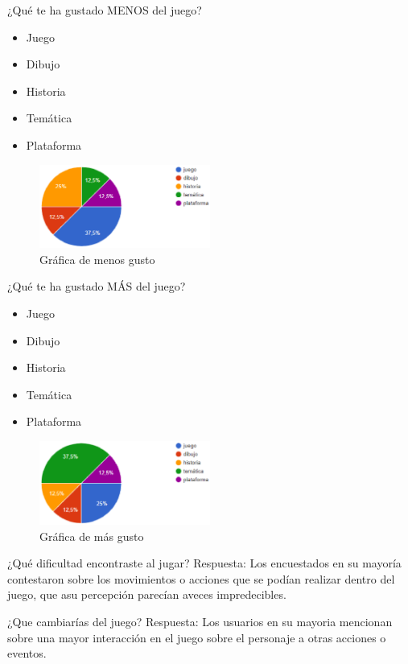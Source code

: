  ¿Qué te ha gustado MENOS del juego?
	\begin{itemize}
		\item Juego
		\item Dibujo
		\item Historia
		\item Temática
		\item Plataforma
	\end{itemize}

\begin{figure}
	\centering
	\caption{Gráfica de menos gusto}
	\label{fig:pos02}
	\includegraphics[width=0.5\textwidth]{04ResultadosObetnidos/pruebaR/imagenes/que/pos02}
\end{figure}

	
	¿Qué te ha gustado MÁS del juego?
\begin{itemize}
	\item Juego
	\item Dibujo
	\item Historia
	\item Temática
	\item Plataforma
\end{itemize}

\begin{figure}
	\centering
	\caption{Gráfica de más gusto}
	\label{fig:pos03}
	\includegraphics[width=0.5\textwidth]{04ResultadosObetnidos/pruebaR/imagenes/que/pos03}
\end{figure}


	 ¿Qué dificultad encontraste al jugar?
	Respuesta: Los encuestados en su mayoría contestaron sobre los movimientos o acciones que se podían realizar dentro del juego, que asu percepción parecían aveces impredecibles.

 ¿Que cambiarías del juego?
	Respuesta: Los usuarios en su mayoria mencionan sobre una mayor interacción en el juego sobre el personaje a otras acciones o eventos. 
	

